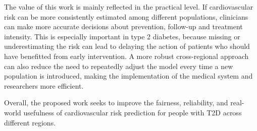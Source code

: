 \documentclass[conference]{IEEEtran}
\begin{document}
The value of this work is mainly reflected in the practical level. If cardiovascular risk can be more consistently estimated among different populations, clinicians can make more accurate decisions about prevention, follow-up and treatment intensity. This is especially important in type 2 diabetes, because missing or underestimating the risk can lead to delaying the action of patients who should have benefitted from early intervention. A more robust cross-regional approach can also reduce the need to repeatedly adjust the model every time a new population is introduced, making the implementation of the medical system and researchers more efficient.

Overall, the proposed work seeks to improve the fairness, reliability, and real-world usefulness of cardiovascular risk prediction for people with T2D across different regions.






\end{document}
